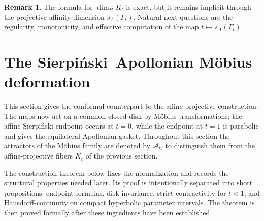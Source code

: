 \documentclass[11pt]{amsart}
\theoremstyle{definition}
\newtheorem{remark}[remark]{Remark}
\begin{document}
\begin{remark}
The formula for $\dim_H K_t$ is exact, but it remains implicit through the projective affinity dimension $s_A(\Gamma_t)$. Natural next questions are the regularity, monotonicity, and effective computation of the map $t\mapsto s_A(\Gamma_t)$.
\end{remark}

\section{The Sierpi\'nski--Apollonian M\"obius deformation}
This section gives the conformal counterpart to the affine-projective construction. The maps now act on a common closed disk by M\"obius transformations; the affine Sierpi\'nski endpoint occurs at $t=0$, while the endpoint at $t=1$ is parabolic and gives the equilateral Apollonian gasket. Throughout this section the attractors of the M\"obius family are denoted by $\mathcal A_t$, to distinguish them from the affine-projective fibers $K_t$ of the previous section.

The construction theorem below fixes the normalization and records the structural properties needed later. Its proof is intentionally separated into short propositions: endpoint formulas, disk invariance, strict contractivity for $t<1$, and Hausdorff-continuity on compact hyperbolic parameter intervals. The theorem is then proved formally after these ingredients have been established.
\end{document}
